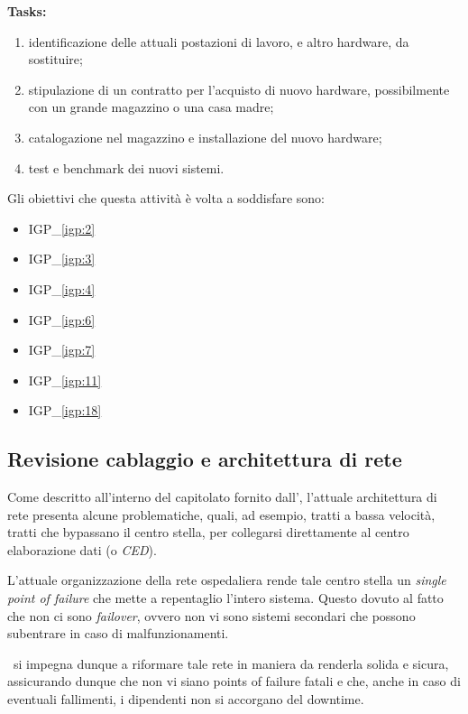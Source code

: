 		\textbf{Tasks:}
		\begin{enumerate}[noitemsep]
			\item identificazione delle attuali postazioni di lavoro, e altro hardware, da sostituire;
			\item stipulazione di un contratto per l'acquisto di nuovo hardware, possibilmente con un grande magazzino o una casa madre;
			\item catalogazione nel magazzino e installazione del nuovo hardware;
			\item test e benchmark dei nuovi sistemi.
		\end{enumerate}

		Gli obiettivi che questa attività è volta a soddisfare sono:
		\begin{itemize}[noitemsep]
			\renewcommand\labelitemi{--}
			\item {\color{pantone}IGP\_\ref{igp:2}}
			\item {\color{pantone}IGP\_\ref{igp:3}}
			\item {\color{pantone}IGP\_\ref{igp:4}}
			\item {\color{pantone}IGP\_\ref{igp:6}}
			\item {\color{pantone}IGP\_\ref{igp:7}}
			\item {\color{pantone}IGP\_\ref{igp:11}}
			\item {\color{pantone}IGP\_\ref{igp:18}}
		\end{itemize}

	\subsection{Revisione cablaggio e architettura di rete}\label{subsec:revisione_rete}
	
		Come descritto all'interno del capitolato fornito dall'\istituto, l'attuale architettura di rete presenta alcune problematiche, quali, ad esempio, tratti a bassa velocità, tratti che bypassano il centro stella, per collegarsi direttamente al centro elaborazione dati (o \textit{CED}).

		L'attuale organizzazione della rete ospedaliera rende tale centro stella un \textit{single point of failure} che mette a repentaglio l'intero sistema.
		Questo dovuto al fatto che non ci sono \textit{failover}, ovvero non vi sono sistemi secondari che possono subentrare in caso di malfunzionamenti.
		
		\azienda~si impegna dunque a riformare tale rete in maniera da renderla solida e sicura, assicurando dunque che non vi siano points of failure fatali e che, anche in caso di eventuali fallimenti, i dipendenti non si accorgano del downtime.
	

